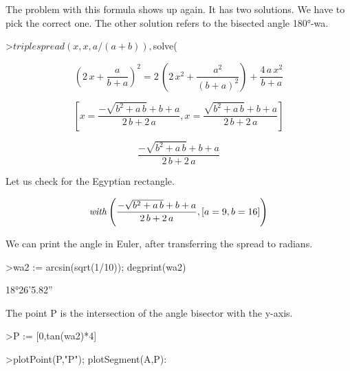 \documentclass[a4paper,10pt]{article}
\begin{document}
\begin{eulernotebook}
\begin{eulercomment}
\begin{eulercomment}
\begin{eulercomment}
\begin{eulercomment}
\begin{eulercomment}
The problem with this formula shows up again. It has two solutions. We
have to pick the correct one. The other solution refers to the
bisected angle 180°-wa.
\end{eulercomment}
\begin{eulerprompt}
>$triplespread(x,x,a/(a+b)), $solve(%
\end{eulerprompt}
\begin{eulerformula}
\[
\left(2\,x+\frac{a}{b+a}\right)^2=2\,\left(2\,x^2+\frac{a^2}{\left(
 b+a\right)^2}\right)+\frac{4\,a\,x^2}{b+a}
\]
\end{eulerformula}
\begin{eulerformula}
\[
\left[ x=\frac{-\sqrt{b^2+a\,b}+b+a}{2\,b+2\,a} , x=\frac{\sqrt{b^2
 +a\,b}+b+a}{2\,b+2\,a} \right] 
\]
\end{eulerformula}
\begin{eulerformula}
\[
\frac{-\sqrt{b^2+a\,b}+b+a}{2\,b+2\,a}
\]
\end{eulerformula}
\begin{eulercomment}
Let us check for the Egyptian rectangle.
\end{eulercomment}
\begin{eulerformula}
\[
{\it with}\left(\frac{-\sqrt{b^2+a\,b}+b+a}{2\,b+2\,a} , \left[ a=9
  , b=16 \right] \right)
\]
\end{eulerformula}
\begin{eulercomment}
We can print the angle in Euler, after transferring the spread to
radians.
\end{eulercomment}
\begin{eulerprompt}
>wa2 := arcsin(sqrt(1/10)); degprint(wa2)
\end{eulerprompt}
\begin{euleroutput}
  18°26'5.82''
\end{euleroutput}
\begin{eulercomment}
The point P is the intersection of the angle bisector with the y-axis.
\end{eulercomment}
\begin{eulerprompt}
>P := [0,tan(wa2)*4]
\end{eulerprompt}
\begin{euleroutput}
  [0,  1.33333]
\end{euleroutput}
\begin{eulerprompt}
>plotPoint(P,"P"); plotSegment(A,P):

\end{eulerprompt}
\end{eulercomment}
\end{eulercomment}
\end{eulercomment}
\end{eulercomment}
\end{eulernotebook}
\end{document}
